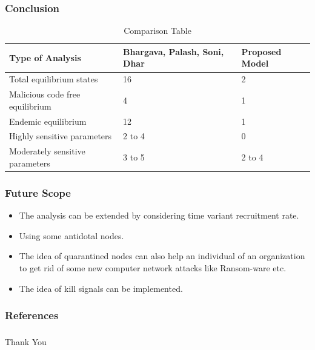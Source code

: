 \documentclass{beamer}
\begin{document}
\begin{frame}\frametitle{Conclusion}
\begin{center}
\begin{table}[h]
\label{comp}
\begin{tabular}{|p{4 cm}|p{2 cm}|p{2 cm}|}
\hline
\bf Type of Analysis &\bf  Bhargava, Palash, Soni, Dhar &\bf Proposed Model \\
\hline
Total equilibrium states& 16 & 2\\
Malicious code free equilibrium & 4 & 1\\
Endemic equilibrium & 12 & 1\\
Highly sensitive parameters& 2 to 4 & 0\\
Moderately sensitive parameters& 3 to 5 & 2 to 4\\
\hline
\end{tabular}
\caption{Comparison Table}
\end{table}
\end{center}
\end{frame}

\begin{frame}\frametitle{Future Scope}
\begin{itemize}
\item The analysis can be extended by considering time variant recruitment rate.
\item Using some antidotal nodes.
\item The idea of quarantined nodes can also help an individual of an organization to get
rid of some new computer network attacks like Ransom-ware etc.
\item The idea of kill signals can be implemented.
\end{itemize}
\end{frame}

\begin{frame}[allowframebreaks]
        \frametitle{References}
        
        
\end{frame}
\begin{frame}\frametitle{}
\Huge
\begin{center}Thank You \end{center}
\end{frame}
\end{document}
